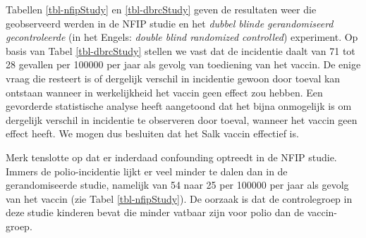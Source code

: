 \documentclass[
  dutch,
  letterpaper,
  12pt]{book}
\theoremstyle{definition}
\theoremstyle{definition}
\theoremstyle{definition}
\theoremstyle{remark}
\begin{document}
\begin{table}

\caption{\label{tbl-nfipStudy}}


\end{table}%

Tabellen \ref{tbl-nfipStudy} en \ref{tbl-dbrcStudy} geven de resultaten
weer die geobserveerd werden in de NFIP studie en het \emph{dubbel
blinde gerandomiseerd gecontroleerde} (in het Engels: \emph{double blind
randomized controlled}) experiment. Op basis van Tabel
\ref{tbl-dbrcStudy} stellen we vast dat de incidentie daalt van 71 tot
28 gevallen per 100000 per jaar als gevolg van toediening van het
vaccin. De enige vraag die resteert is of dergelijk verschil in
incidentie gewoon door toeval kan ontstaan wanneer in werkelijkheid het
vaccin geen effect zou hebben. Een gevorderde statistische analyse heeft
aangetoond dat het bijna onmogelijk is om dergelijk verschil in
incidentie te observeren door toeval, wanneer het vaccin geen effect
heeft. We mogen dus besluiten dat het Salk vaccin effectief is.

Merk tenslotte op dat er inderdaad confounding optreedt in de NFIP
studie. Immers de polio-incidentie lijkt er veel minder te dalen dan in
de gerandomiseerde studie, namelijk van 54 naar 25 per 100000 per jaar
als gevolg van het vaccin (zie Tabel \ref{tbl-nfipStudy}). De oorzaak is
dat de controlegroep in deze studie kinderen bevat die minder vatbaar
zijn voor polio dan de vaccin-groep.

\begin{table}

\caption{\label{tbl-dbrcStudy}}


\end{table}%
\end{document}
